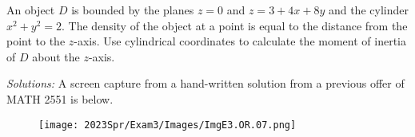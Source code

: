     
\fi





\ifnum {}
\question[6] An object $D$ is bounded by the planes $z=0$ and $z=3+4x+8y$ and the cylinder $x^2+y^2 = 2$. The density of the object at a point is equal to the distance from the point to the $z$-axis. Use cylindrical coordinates to calculate the moment of inertia of $D$ about the $z$-axis.

\ifnum {} {\color{DarkBlue} \textit{Solutions:} A screen capture from a hand-written solution from a previous offer of MATH 2551 is below. 
    \begin{figure}[h]
    \centering
    \texttt{[image: 2023Spr/Exam3/Images/ImgE3.OR.07.png]}
    \end{figure}  
    
    } 
   \else
      
   \fi
    
\fi
    
